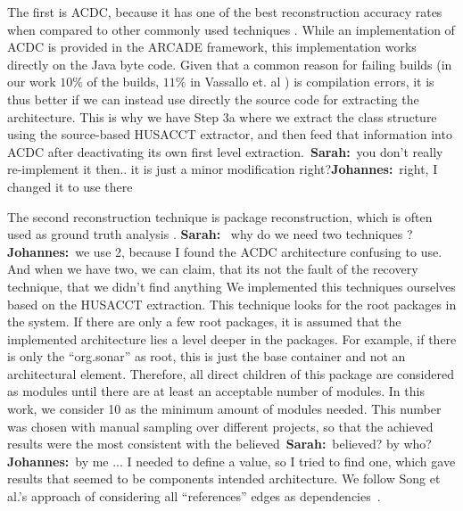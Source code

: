 \documentclass[sigplan, anonymous, review]{acmart}
\newcommand{\sn}[1]{{\color{blue}\textbf{Sarah:}~#1}}
\newcommand{\jk}[1]{{\color{violet}\textbf{Johannes:}~#1}}
\begin{document}
The first is ACDC, because it has one of the best reconstruction accuracy rates when compared to other commonly used techniques \cite{arcRec-comparison}. 
While an implementation of ACDC is provided in the ARCADE framework, this implementation works directly on the Java byte code.  Given that a common reason for failing builds (in our work $10\%$ of the builds, $11\%$ in Vassallo et. al \cite{CIFailTypes}) is compilation errors, it is thus better if we can instead use directly the source code for extracting the architecture. This is why we have Step 3a where we extract the class structure using the source-based HUSACCT extractor, and then feed that information into ACDC after deactivating its own first level extraction.~\sn{you don't really re-implement it then.. it is just a minor modification right?}\jk{right, I changed it to use there}

The second reconstruction technique is package reconstruction, which is often used as ground truth analysis \cite{arcRec-comparison}. 
\sn{ why do we need two techniques ?} \jk{we use 2, because I found the ACDC architecture confusing to use. And when we have two, we can claim, that its not the fault of the recovery technique, that we didn't find anything} 
We implemented this techniques ourselves based on the HUSACCT extraction.
This technique looks for the root packages in the system. If there are only a few root packages, it is assumed that the implemented architecture lies a level deeper in the packages. For example, if there is only the ``org.sonar'' as root, this is just the base container and not an architectural element. Therefore, all direct children of this package are considered as modules until there are at least an acceptable number of modules. In this work, we consider 10 as the minimum amount of modules needed. This number was chosen with manual sampling over different projects, so that the achieved results were the most consistent with the believed~\sn{believed? by who?}\jk{by me ... I needed to define a value, so I tried to find one, which gave results that seemed to be components} intended architecture. We follow Song et al.'s approach of considering all ``references'' edges as dependencies~\cite{ArcAsGraph}. 
\end{document}
